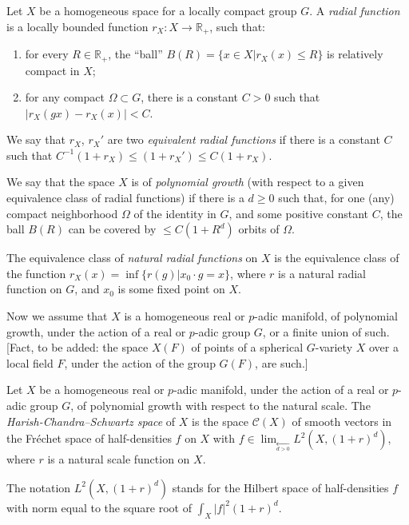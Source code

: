 \begin{definition}
 \label{definition-radial-homogeneous}
Let $X$ be a homogeneous space for a locally compact group $G$. A {\it radial function} is a locally bounded function $r_X: X\to \mathbb R_+$, such that:
\begin{enumerate}
 \item for every $R \in \mathbb R_+$, the ``ball'' $B(R) = \{ x\in X| r_X(x)\le R\}$ is relatively compact in $X$;
 \item for any compact $\Omega\subset G$, there is a constant $C>0$ such that $|r_X(gx)-r_X(x)|<C$. 
\end{enumerate}
We say that $r_X$, $r_X'$ are two {\it equivalent radial functions} if there is a constant $C$ such that $C^{-1}(1+r_X)\le (1+r_X')\le C(1+r_X)$. 

We say that the space $X$ is of {\it polynomial growth} (with respect to a given equivalence class of radial functions) if there is a $d\ge 0$ such that, for one (any) compact neighborhood $\Omega$ of the identity in $G$, and some positive constant $C$, the ball $B(R)$ can be covered by $\le C(1+R^d)$ orbits of $\Omega$. 

The equivalence class of {\it natural radial functions} on $X$ is the equivalence class of the function $ r_X( x) = \inf\{r(g)| x_0\cdot g = x\}$, where $r$ is a natural radial function on $G$, and $x_0$ is some fixed point on $X$. 
\end{definition}

Now we assume that $X$ is a homogeneous real or $p$-adic manifold, of polynomial growth, under the action of a real or $p$-adic group $G$, or a finite union of such. [Fact, to be added: the space $X(F)$ of points of a spherical $G$-variety $X$ over a local field $F$, under the action of the group $G(F)$, are such.] 

\begin{definition}
 \label{definition-Harish-Chandra-Schwartz}
Let $X$ be a homogeneous real or $p$-adic manifold, under the action of a real or $p$-adic group $G$, of polynomial growth with respect to the natural scale. The {\it Harish-Chandra--Schwartz space} of $X$ is the space $\mathcal C(X)$ of smooth vectors in the Fr\'echet space of half-densities $f$ on $X$ with $f \in \lim_{\underset{d >0}{\leftarrow}} L^2(X, (1+r)^d)$, where $r$ is a natural scale function on $X$. 
\end{definition}

The notation $L^2(X, (1+r)^d)$ stands for the Hilbert space of half-densities $f$ with norm equal to the square root of $\int_X |f|^2 (1+r)^d$. 

